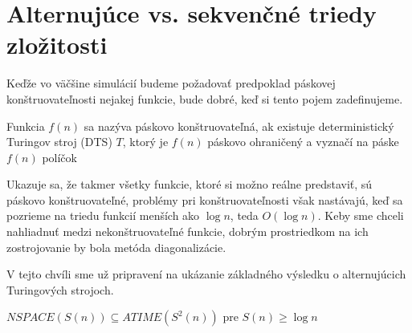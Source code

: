 \section{Alternujúce vs. sekvenčné triedy zložitosti}

Keďže vo väčšine simulácií budeme požadovať predpoklad páskovej
konštruovateľnosti nejakej funkcie, bude dobré, keď si tento pojem
zadefinujeme.

\begin{definicia}
Funkcia $f(n)$ sa nazýva páskovo konštruovateľná, ak existuje
deterministický Turingov stroj (DTS) $T$, ktorý je $f(n)$ páskovo
ohraničený a vyznačí na páske $f(n)$ políčok
\end{definicia}

Ukazuje sa, že takmer všetky funkcie, ktoré si možno reálne
predstaviť, sú páskovo konštruovateľné, problémy pri
konštruovateľnosti však nastávajú, keď sa pozrieme na triedu
funkcií menších ako $\log n$, teda $O(\log n)$. Keby sme chceli
nahliadnuť medzi nekonštruovateľné funkcie, dobrým prostriedkom na
ich zostrojovanie by bola metóda diagonalizácie.

\smallskip
V tejto chvíli sme už pripravení na ukázanie základného výsledku o
alternujúcich Turingových strojoch.

\begin{veta}
\label{alter_veta_nspaceatime} $NSPACE(S(n))\subseteq ATIME(S^2(n))$ pre
$S(n)\geq\log n$
\end{veta}

